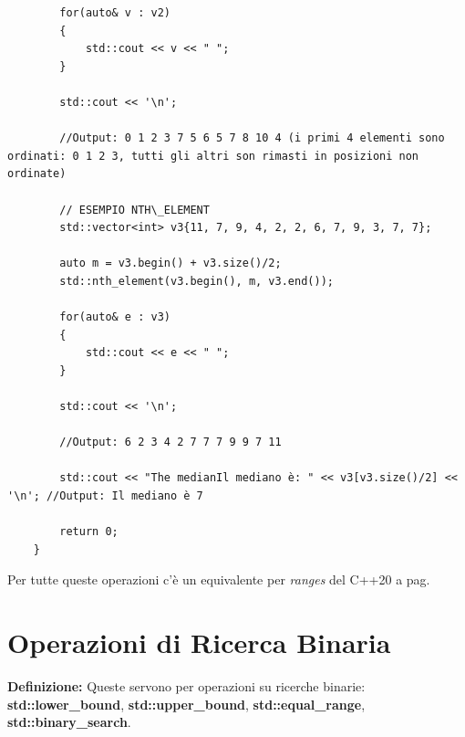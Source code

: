 \begin{lstlisting}
		for(auto& v : v2)
		{
			std::cout << v << " ";
		}
	
		std::cout << '\n';
		
		//Output: 0 1 2 3 7 5 6 5 7 8 10 4 (i primi 4 elementi sono ordinati: 0 1 2 3, tutti gli altri son rimasti in posizioni non ordinate)
		
		// ESEMPIO NTH\_ELEMENT
		std::vector<int> v3{11, 7, 9, 4, 2, 2, 6, 7, 9, 3, 7, 7};
		
		auto m = v3.begin() + v3.size()/2;
		std::nth_element(v3.begin(), m, v3.end());
		
		for(auto& e : v3)
		{
			std::cout << e << " ";
		}
		
		std::cout << '\n';
		
		//Output: 6 2 3 4 2 7 7 7 9 9 7 11
		
		std::cout << "The medianIl mediano è: " << v3[v3.size()/2] << '\n'; //Output: Il mediano è 7
		
		return 0;
	}
\end{lstlisting}

\fleuron

\textsf{\small Per tutte queste operazioni c'è un equivalente per \emph{ranges} del C++20 a pag. \pageref{ranges}} \\


\newpage

\section{Operazioni di Ricerca Binaria}

\textsf{\small \textbf{Definizione: } Queste servono per operazioni su ricerche binarie: \textbf{std::lower\_bound}, \textbf{std::upper\_bound}, \textbf{std::equal\_range}, \textbf{std::binary\_search}.} \\


